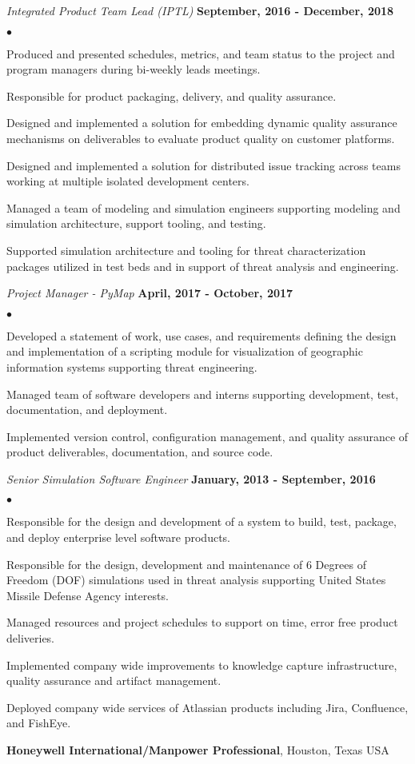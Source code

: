 \documentclass[margin,line]{res}
\newenvironment{list2}{
  \begin{list}{$\bullet$}{%
      \setlength{\itemsep}{0in}
      \setlength{\parsep}{0in} \setlength{\parskip}{0in}
      \setlength{\topsep}{0in} \setlength{\partopsep}{0in} 
      \setlength{\leftmargin}{0.2in}}}{\end{list}}
\begin{document}
\begin{resume}
{\em Integrated Product Team Lead (IPTL)} \hfill {\bf September, 2016 - December, 2018} \vspace*{.05in}
\begin{list2}
\item Produced and presented schedules, metrics, and team status to the project and program managers during bi-weekly leads meetings.
\item Responsible for product packaging, delivery, and quality assurance.
\item Designed and implemented a solution for embedding dynamic quality assurance mechanisms on deliverables to evaluate product quality on customer platforms.
\item Designed and implemented a solution for distributed issue tracking across teams working at multiple isolated development centers.
\item Managed a team of modeling and simulation engineers supporting modeling and simulation architecture, support tooling, and testing. 
\item Supported simulation architecture and tooling for threat characterization packages utilized in test beds and in support of threat analysis and engineering.
\end{list2}
{\em Project Manager - PyMap} \hfill {\bf April, 2017 - October, 2017} \vspace*{.05in}
\begin{list2}
\item Developed a statement of work, use cases, and requirements defining the design and implementation of a scripting module for visualization of geographic information systems supporting threat engineering.
\item Managed team of software developers and interns supporting development, test, documentation, and deployment.
\item Implemented version control, configuration management, and quality assurance of product deliverables, documentation, and source code.
\end{list2}
{\em Senior Simulation Software Engineer} \hfill {\bf January, 2013 - September, 2016} \vspace*{.05in}
\begin{list2}
\item Responsible for the design and development of a system to build, test,
    package, and deploy enterprise level software products.
\item Responsible for the design, development and maintenance of 6 Degrees of
    Freedom (DOF) simulations used in threat analysis supporting United States
    Missile Defense Agency interests.
\item Managed resources and project schedules to support on time, error free
    product deliveries.
\item Implemented company wide improvements to knowledge capture infrastructure, quality assurance and artifact management.
\item Deployed company wide services of Atlassian products including Jira, Confluence, and FishEye.
\end{list2}
{\bf Honeywell International/Manpower Professional}, Houston, Texas USA


\end{resume}
\end{document}
